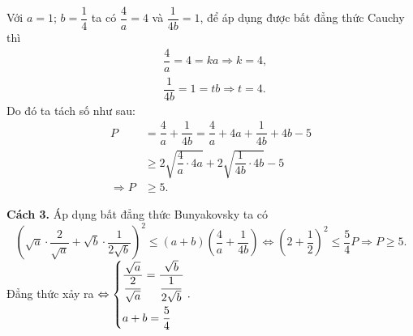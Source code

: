 {\begin{vd}
{\begin{nx}
			Với $a=1$; $b=\dfrac{1}{4}$ ta có $\dfrac{4}{a}=4$ và $\dfrac{1}{4b}=1$, để áp dụng được bất đẳng thức Cauchy thì
			\begin{align*}
			&\dfrac{4}{a}=4=ka \Rightarrow k=4,\\
			&\dfrac{1}{4b}=1=tb \Rightarrow t=4.
			\end{align*}
			Do đó ta tách số như sau:
			\begin{align*}
			P&=\dfrac{4}{a}+\dfrac{1}{4b}=\dfrac{4}{a}+4a+\dfrac{1}{4b}+4b-5\\
			&\geq 2\sqrt{\dfrac{4}{a}\cdot 4a}+2\sqrt{\dfrac{1}{4b}\cdot 4b}-5\\
			\Rightarrow P& \geq 5.
			\end{align*}
		\end{nx}
		\textbf{Cách 3.} Áp dụng bất đẳng thức Bunyakovsky ta có
		\begin{equation*}
		\left(\sqrt{a}\cdot \dfrac{2}{\sqrt{a}}+\sqrt{b}\cdot \dfrac{1}{2\sqrt{b}}\right)^2 \leq \left(a+b\right)\left(\dfrac{4}{a}+\dfrac{1}{4b}\right) \Leftrightarrow \left(2+\dfrac{1}{2}\right)^2 \leq \dfrac{5}{4}P \Rightarrow P \geq 5.
		\end{equation*}
		Đẳng thức xảy ra $\Leftrightarrow \left\{\begin{aligned}& \dfrac{\sqrt{a}}{\dfrac{2}{\sqrt{a}}}=\dfrac{\sqrt{b}}{\dfrac{1}{2\sqrt{b}}}\\& a+b=\dfrac{5}{4}\end{aligned}\right.. $}
\end{vd}

}
